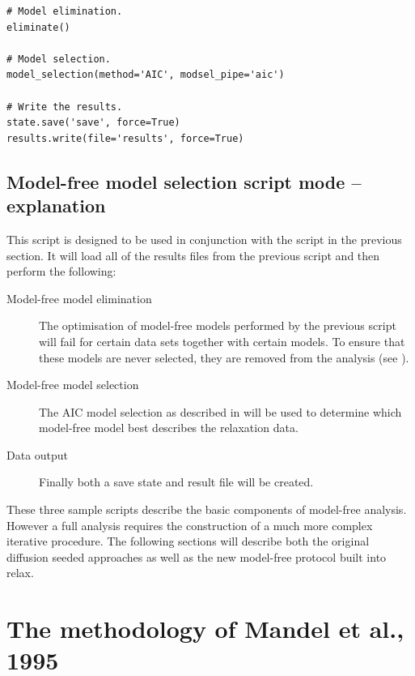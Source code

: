 \begin{htmlonly}
\begin{htmlonly}
\begin{lstlisting}
# Model elimination.
eliminate()

# Model selection.
model_selection(method='AIC', modsel_pipe='aic')

# Write the results.
state.save('save', force=True)
results.write(file='results', force=True)
\end{lstlisting}



\subsection{Model-free model selection script mode -- explanation}

This script is designed to be used in conjunction with the  script in the previous section.  It will load all of the results files from the previous script and then perform the following:

\begin{description}
\item[Model-free model elimination]  The optimisation of model-free models performed by the previous script will fail for certain data sets together with certain models.  To ensure that these models are never selected, they are removed from the analysis (see \citet{dAuvergneGooley06}).
\item[Model-free model selection]  The AIC model selection as described in \citet{dAuvergneGooley03} will be used to determine which model-free model best describes the relaxation data.
\item[Data output]  Finally both a save state and result file will be created.
\end{description}

These three sample scripts describe the basic components of model-free analysis.  However a full analysis requires the construction of a much more complex iterative procedure.  The following sections will describe both the original diffusion seeded approaches as well as the new model-free protocol built into relax.



\section{The methodology of Mandel et al., 1995}
\label{sect: Mandel 1995}


\end{htmlonly}
\end{htmlonly}

